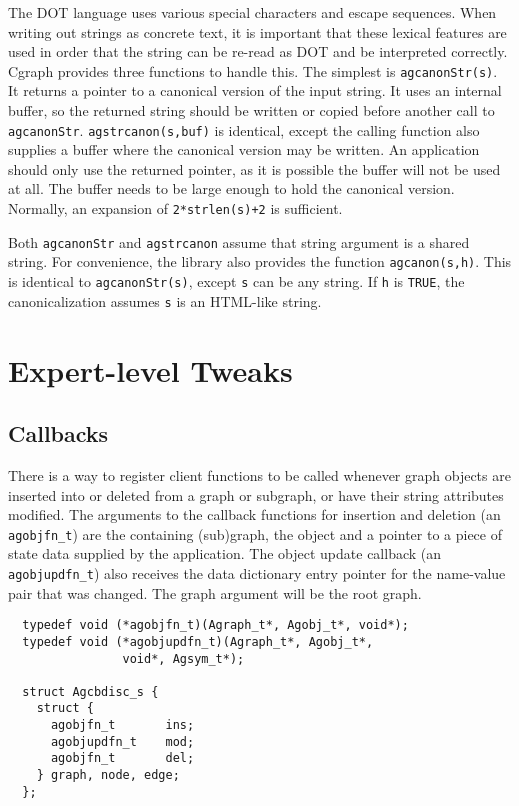 \documentclass[11pt,letterpaper]{article}
\begin{document}
The DOT language uses various special characters and escape sequences. When writing out
strings as concrete text, it is important that these lexical features are used in order
that the string can be re-read as DOT and be interpreted correctly.
Cgraph provides three functions to handle this. The simplest is \verb"agcanonStr(s)". 
It returns a pointer to a canonical version of the input string. It uses an internal 
buffer, so the returned string should be written or copied before another call to 
\verb"agcanonStr". \verb"agstrcanon(s,buf)" is identical, except the calling function
also supplies a buffer where the canonical version may be written. An application should only use
the returned pointer, as it is possible the buffer will not be used at all. The buffer
needs to be large enough to hold the canonical version. Normally, an expansion of 
\verb"2*strlen(s)+2" is sufficient.

Both \verb"agcanonStr" and \verb"agstrcanon" assume that string argument is a
shared string. For convenience, the library also provides the function \verb"agcanon(s,h)".
This is identical to \verb"agcanonStr(s)", except \verb"s" can be any string. If \verb"h"
is \verb"TRUE", the canonicalization assumes \verb"s" is an HTML-like string.

\section{Expert-level Tweaks}
\label{sec:expertleveltweaks}

\subsection{Callbacks}
\label{subsec:callbacks}

There is a way to register client functions to be called
whenever graph objects are inserted into or deleted from a graph or subgraph,
or have their string attributes modified. 
The arguments to the callback functions for insertion and
deletion (an \verb"agobjfn_t") are the containing (sub)graph, the object and a pointer
to a piece of state data supplied by the application.
The object update callback (an \verb"agobjupdfn_t") also
receives the data dictionary entry pointer for the
name-value pair that was changed.
The graph argument will be the root graph.

\begin{verbatim}
  typedef void (*agobjfn_t)(Agraph_t*, Agobj_t*, void*);
  typedef void (*agobjupdfn_t)(Agraph_t*, Agobj_t*, 
                void*, Agsym_t*);

  struct Agcbdisc_s {
    struct {
      agobjfn_t       ins;
      agobjupdfn_t    mod;
      agobjfn_t       del;
    } graph, node, edge;
  };
\end{verbatim}
\end{document}
